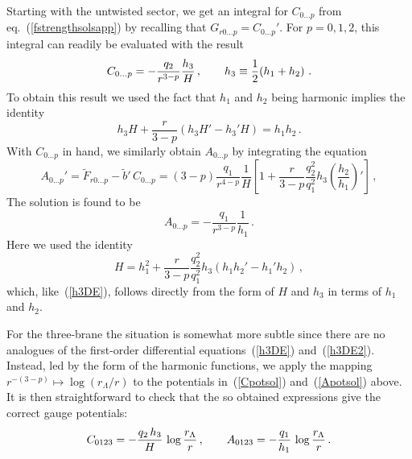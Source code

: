 \documentclass[a4paper,11pt]{article}
\newcommand{\eqref}[1]{(\ref{#1})}
\begin{document}
Starting with the untwisted sector, we get an integral for $C_{0\ldots
p}$ from eq.~\eqref{fstrengthsolsapp} by recalling that $G_{r0\ldots
p} = C_{0\ldots p}'$. For $p=0,1,2$, this integral can readily be
evaluated with the result
\begin{equation}
\label{Cpotsol}
C_{0\ldots p} = - \frac{q_2}{r^{3-p}} \frac{h_3}{H} \,,\qquad h_3 \equiv
 \frac{1}{2}(h_1+h_2) \ .
\end{equation}
To obtain this result we used the fact that $h_1$ and $h_2$ being
harmonic implies the identity
\begin{equation}
\label{h3DE}
h_3 H + \frac{r}{3-p} ( h_3 H' - h_3' H ) = h_1 h_2 \,.
\end{equation}
With $C_{0\ldots p}$ in hand, we similarly obtain $A_{0\ldots p}$ by
integrating the equation
\begin{equation}
\label{Adiffeq}
A_{0\ldots p}' = \tilde{F}_{r0\ldots p} - \tilde{b}'\,C_{0\ldots p} =
 (3-p)\frac{q_1}{r^{4-p}} \frac{1}{H} \left[ 1 + \frac{r}{3-p}
 \frac{q_2^2}{q_1^2} h_3 \left( \frac{h_2}{h_1} \right)' \right] \,,
\end{equation}
The solution is found to be
\begin{equation}
\label{Apotsol}
A_{0\ldots p} = - \frac{q_1}{r^{3-p}}\frac{1}{h_1} \,.
\end{equation}
Here we used the identity
\begin{equation}
\label{h3DE2}
H = h_1^2 + \frac{r}{3-p}\frac{q_2^2}{q_1^2}h_3(h_1 h_2' - h_1' h_2)
\,,
\end{equation}
which, like~\eqref{h3DE}, follows directly from the form of $H$ and
$h_3$ in terms of $h_1$ and $h_2$.

For the three-brane the situation is somewhat more subtle since
there are no analogues of the first-order differential
equations~\eqref{h3DE} and~\eqref{h3DE2}. Instead, led by the
form of the harmonic functions, we apply the mapping
$r^{-(3-p)}\mapsto\log(r_\Lambda/r)$ to the potentials
in~\eqref{Cpotsol} and~\eqref{Apotsol} above. It is then
straightforward to check that the so obtained expressions
give the correct gauge potentials:
%
\begin{equation}
C_{0123} = - \frac{q_2\,h_3}{H}\,\log\frac{r_\Lambda}{r} \spa
%
A_{0123} = - \frac{q_1}{h_1}\,\log\frac{r_\Lambda}{r} \,.
\end{equation}
\end{document}
